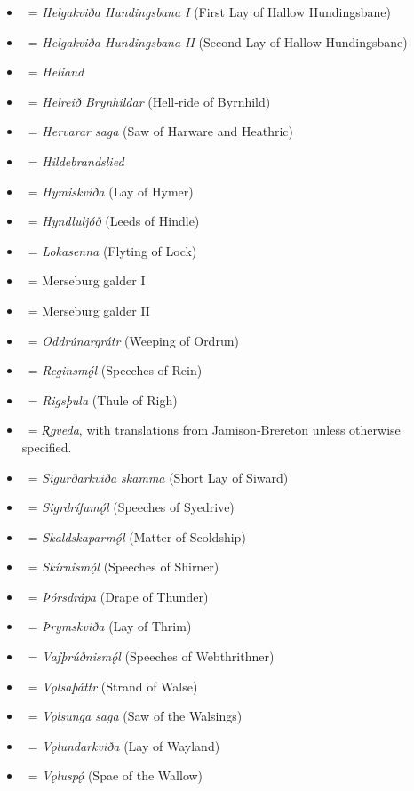 \begin{itemize}
	\item \HelgakvidaOne\ = \emph{Helgakviða Hundingsbana I} (First Lay of Hallow Hundingsbane)
	\item \HelgakvidaTwo\ = \emph{Helgakviða Hundingsbana II} (Second Lay of Hallow Hundingsbane)
	\item \Heliand\ = \emph{Heliand}
	\item \Helreid\ = \emph{Helreið Brynhildar} (Hell‑ride of Byrnhild)
	\item \HervararSaga\ = \emph{Hervarar saga} (Saw of Harware and Heathric)
	\item \Hildebrandslied\ = \emph{Hildebrandslied}
	\item \Hymiskvida\ = \emph{Hymiskviða} (Lay of Hymer)
	\item \Hyndluljod\ = \emph{Hyndluljóð} (Leeds of Hindle)
	\item \Lokasenna\ = \emph{Lokasenna} (Flyting of Lock)
	\item \MerseburgOne\ = Merseburg galder I
	\item \MerseburgTwo\ = Merseburg galder II
	\item \Oddrunargratr\ = \emph{Oddrúnargrátr} (Weeping of Ordrun)
	\item \Reginsmal\ = \emph{Reginsmǫ́l} (Speeches of Rein)
	\item \Rigsthula\ = \emph{Rigsþula} (Thule of Righ)
	\item \Rigveda\ = \emph{R̥gveda}, with translations from Jamison‑Brereton unless otherwise specified.
	\item \Sigurdskamma\ = \emph{Sigurðarkviða skamma} (Short Lay of Siward)
	\item \Sigrdrifumal\ = \emph{Sigrdrífumǫ́l} (Speeches of Syedrive)
	\item \Skaldskaparmal\ = \emph{Skaldskaparmǫ́l} (Matter of Scoldship)
	\item \Skirnismal\ = \emph{Skírnismǫ́l} (Speeches of Shirner)
	\item \Thorsdrapa\ = \emph{Þórsdrápa} (Drape of Thunder)
	\item \Thrymskvida\ = \emph{Þrymskviða} (Lay of Thrim)
	\item \Vafthrudnismal\ = \emph{Vafþrúðnismǫ́l} (Speeches of Webthrithner)
	\item \Volsathattr\ = \emph{Vǫlsaþáttr} (Strand of Walse)
	\item \VolsungaSaga\ = \emph{Vǫlsunga saga} (Saw of the Walsings)
	\item \Volundarkvida\ = \emph{Vǫlundarkviða} (Lay of Wayland)
	\item \Voluspa\ = \emph{Vǫluspǫ́} (Spae of the Wallow)
\end{itemize}%


